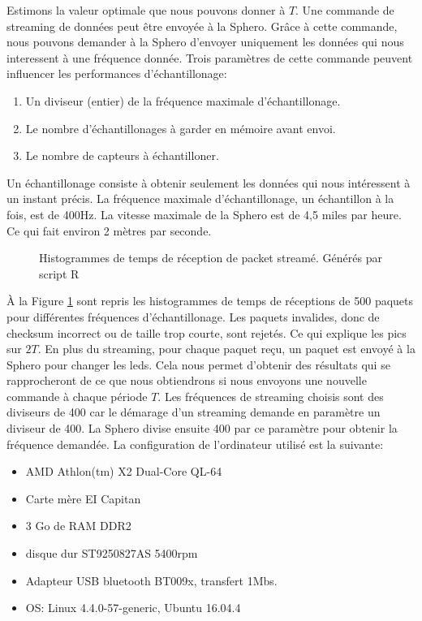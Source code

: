 Estimons la valeur optimale que nous pouvons donner à $T$.
Une commande de streaming de données peut être envoyée à la Sphero.
Grâce à cette commande, nous pouvons demander à la Sphero d'envoyer uniquement les données qui nous interessent à une fréquence donnée.
Trois paramètres de cette commande peuvent influencer les performances d'échantillonage:
\begin{enumerate}
 \item Un diviseur (entier) de la fréquence maximale d'échantillonage.
 \item Le nombre d'échantillonages à garder en mémoire avant envoi.
 \item Le nombre de capteurs à échantilloner.
\end{enumerate}
Un échantillonage consiste à obtenir seulement les données qui nous intéressent à un instant précis.
La fréquence maximale d'échantillonage, un échantillon à la fois, est de 400Hz.\cite{SDKofficiels}
La vitesse maximale de la Sphero est de 4,5 miles par heure.\cite{product} Ce qui fait environ 2 mètres par seconde.
\begin{figure}
 \centering
 \caption{Histogrammes de temps de réception de packet streamé. Générés par script R}
 \label{histogrammes}
\end{figure}

À la Figure \ref{histogrammes} sont repris les histogrammes de temps de réceptions de 500 paquets pour différentes fréquences d'échantillonage.
Les paquets invalides, donc de checksum incorrect ou de taille trop courte, sont rejetés.
Ce qui explique les pics sur $2T$.
En plus du streaming, pour chaque paquet reçu, un paquet est envoyé à la Sphero pour changer les leds.
Cela nous permet d'obtenir des résultats qui se rapprocheront de ce que nous obtiendrons si nous envoyons une nouvelle commande à chaque période $T$.
Les fréquences de streaming choisis sont des diviseurs de 400 car le démarage d'un streaming demande en paramètre un diviseur de 400.\cite{SDKofficiels}
La Sphero divise ensuite 400 par ce paramètre pour obtenir la fréquence demandée.
La configuration de l'ordinateur utilisé est la suivante:
\begin{itemize}
 \item AMD Athlon(tm) X2 Dual-Core QL-64
 \item Carte mère EI Capitan
 \item 3 Go de RAM DDR2
 \item disque dur ST9250827AS 5400rpm
 \item Adapteur USB bluetooth BT009x, transfert 1Mbs.
 \item OS: Linux 4.4.0-57-generic, Ubuntu 16.04.4
\end{itemize}

